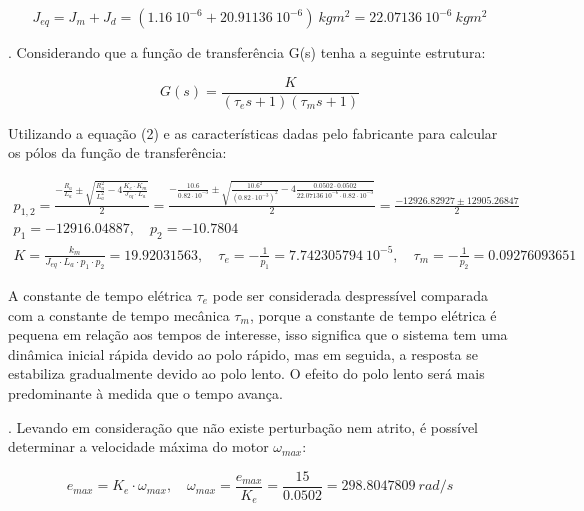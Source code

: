 \documentclass[10pt]{article}
\begin{document}
\begin{equation}
    J_{eq} = J_m + J_d = (1.16 \ 10^{-6} + 20.91136 \ 10^{-6}) \ kgm^2
    = 22.07136 \ 10^{-6} \ kgm^2
\end{equation}

. Considerando que a função de transferência G(s) tenha a seguinte estrutura:

\begin{equation}
    G(s) = \frac{K}{(\tau_e s + 1)(\tau_m s + 1)}
\end{equation}

\quad Utilizando a equação (2) e as características dadas pelo fabricante para calcular
os pólos da função de transferência:

\begin{equation}
\begin{aligned}
    p_{1,2} = \frac{-\frac{R_a}{L_a} \pm \sqrt{\frac{R_a^2}{L_a^2} - 4\frac{K_e \cdot K_m}{J_{eq} \cdot L_a}}}{2}
    = \frac{-\frac{10.6}{0.82 \cdot 10^{-3}} \pm \sqrt{\frac{10.6^2}{(0.82 \cdot 10^{-3})^2} - 4\frac{0.0502 \cdot 0.0502}{22.07136 \ 10^{-6} \cdot 0.82 \cdot 10^{-3}}}}{2}
    = \frac{-12926.82927 \pm 12905.26847}{2} \\
    p_1 = -12916.04887, \quad p_2 = -10.7804 \\
    K = \frac{k_m}{J_{eq} \cdot L_a \cdot p_1 \cdot p_2} = 19.92031563, \quad \tau_e = -\frac{1}{p_1} = 7.742305794 \ 10^{-5}, \quad \tau_m = -\frac{1}{p_2} = 0.09276093651
\end{aligned}
\end{equation}

\quad A constante de tempo elétrica $\tau_e$ pode ser considerada despressível
comparada com a constante de tempo mecânica $\tau_m$,
porque a constante de tempo elétrica é pequena em relação aos tempos de interesse,
isso significa que o sistema tem uma dinâmica inicial rápida devido ao polo rápido,
mas em seguida, a resposta se estabiliza gradualmente devido ao polo lento.
O efeito do polo lento será mais predominante à medida que o tempo avança.

. Levando em consideração que não existe perturbação nem atrito,
é possível determinar a velocidade máxima do motor $\omega_{max}$:

\begin{equation}
    e_{max} = K_e \cdot \omega_{max},
    \quad \omega_{max} = \frac{e_{max}}{K_e} = \frac{15}{0.0502} = 298.8047809 \ rad/s
\end{equation}
\end{document}
